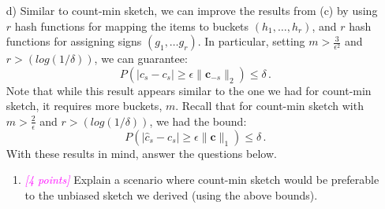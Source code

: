 \documentclass{exam}
\newcommand{\grade}[1]{\small\textcolor{magenta}{\emph{[#1 points]}} \normalsize}
\newcommand{\sol}[1]{\ifshowsolutions{\leavevmode{\color{blue}Solution: #1}}\fi}
\newif\ifshowsolutions
\begin{document}
\begin{itemize}
\newpage
\item[{d)}] Similar to count-min sketch, we can improve the results from (c) by using $r$ hash functions for mapping the items to buckets $(h_1, \dots, h_r)$, and $r$ hash functions for assigning signs $(g_1, \dots g_r)$. In particular, setting $m > \frac{3}{\epsilon^2}$ and $r > (log(1/\delta))$, we can guarantee: 
$$
P(|\hat{c}_s - c_s| \ge \epsilon \|\mathbf{c}_{-s}\|_2) \le \delta\, .
$$
Note that while this result appears similar to the one we had for count-min sketch, it requires more buckets, $m$. Recall that for count-min sketch with $m > \frac{2}{\epsilon}$ and $r > (log(1/\delta))$, we had the bound:
$$
P(|\hat{c}_s - c_s| \ge \epsilon \|\mathbf{c}\|_1) \le \delta \, .
$$
With these results in mind, answer the questions below. 
\begin{enumerate}[label=\roman*.]
\item \grade{4} Explain a scenario where count-min sketch would be preferable to the unbiased sketch we derived (using the above bounds). \\
\sol{CMS requires less counters (note that we need only $m > 2/\epsilon$ buckets for CMS, but $m > 3/\epsilon^2$ for the unbiased sketch). Thus, if $\|\mathbf{c}\|_1$ and $\|\mathbf{c}_{-s}\|_2$ are similar, CMS would be preferable since it requires less space.}
\vspace{5em}


\end{enumerate}
\end{itemize}
\end{document}
